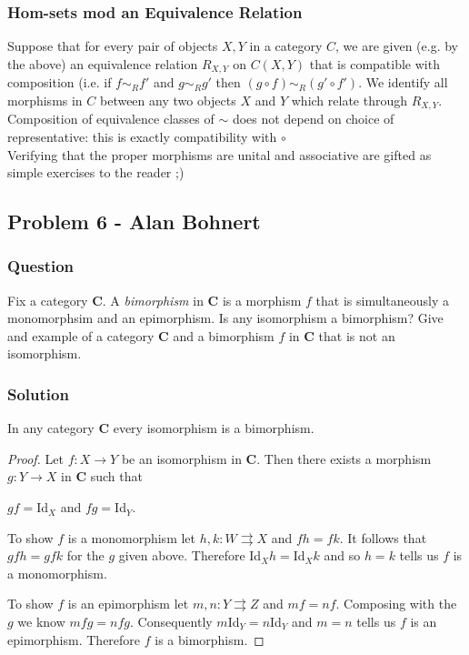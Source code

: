 \documentclass{article}
\begin{document}
	\subsubsection{Hom-sets mod an Equivalence Relation}
	Suppose that for every pair of objects $X,Y$ in a category $C$, we are given (e.g. by the above) an equivalence relation $R_{X,Y}$ on $C(X,Y)$ that is compatible with composition (i.e. if $f\sim_Rf'$ and $g\sim_Rg'$ then $(g\circ{}f)\sim_R(g'\circ{}f')$.  We identify all morphisms in $C$ between any two objects $X$ and $Y$ which relate through $R_{X,Y}$.  Composition of equivalence classes of $\sim{}$ does not depend on choice of representative: this is exactly compatibility with $\circ{}$\\Verifying that the proper morphisms are unital and associative are gifted as simple exercises to the reader ;)
	
	
	
	\subsection{Problem 6 - Alan Bohnert}
	\subsubsection{Question}
	Fix a category \textbf{C}. 
	A \textit{bimorphism} in \textbf{C} is a morphism $f$ that is simultaneously a monomorphsim and an epimorphism. Is any isomorphism a bimorphism? 
	Give and example of a category \textbf{C} and a bimorphism $f$ in \textbf{C} that is not an isomorphism.
	
	\subsubsection{Solution}
	In any category \textbf{C} every isomorphism is a bimorphism.
	
	\begin{proof}
		Let $f:X\xrightarrow{}Y$ be an isomorphism in \textbf{C}. 
		Then there exists a morphism $g:Y\xrightarrow{}X$ in \textbf{C} such that 
		\begin{center}
			$gf=$Id$_X$ and $fg=$Id$_Y$.
		\end{center}
		
		To show $f$ is a monomorphism let $h,k:W \rightrightarrows X$ and $fh=fk$.
		It follows that $gfh=gfk$ for the $g$ given above.
		Therefore Id$_X h=$Id$_X k$ and so $h=k$ tells us $f$ is a monomorphism.
		
		To show $f$ is an epimorphism let $m,n:Y \rightrightarrows Z$ and $mf=nf$.
		Composing with the $g$ we know $mfg=nfg$.
		Consequently $m$Id$_Y=n$Id$_Y$ and $m=n$ tells us $f$ is an epimorphism.
		Therefore $f$ is a bimorphism.
	\end{proof}
	
\end{document}
